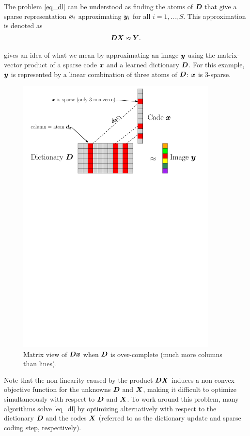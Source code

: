 \noindent
The problem \eqref{eq_dl} can be understood as finding the atoms of $\bm{D}$ that give a sparse representation $\bm{x}_i$ approximating $\bm{y}_i$ for all $i = 1,\dots,S$. This approximation is denoted as
\begin{equation*}\bm{D}\bm{X} \approx \bm{Y}.\end{equation*}

\noindent
{} gives an idea of what we mean by approximating an image $\bm{y}$ using the matrix-vector product of a sparse code $\bm{x}$ and a learned dictionary $\bm{D}$. For this example, $\bm{y}$ is represented by a linear combination of three atoms of $\bm{D}$: $\bm{x}$ is 3-sparse.

\begin{figure}[!ht] \centering
\includegraphics[width=0.90\textwidth]{figures/sparsity-matrix.pdf}
\caption{Matrix view of $\bm{D}\bm{x}$ when $\bm{D}$ is over-complete (much more columns than lines).}\label{fig_overcomplete_matrix}
\end{figure}


Note that the non-linearity caused by the product $\bm{D}\bm{X}$ induces a non-convex objective function for the unknowns $\bm{D}$ and $\bm{X}$, making it difficult to optimize simultaneously with respect to $\bm{D}$ and $\bm{X}$. To work around this problem, many algorithms solve \eqref{eq_dl} by optimizing alternatively with respect to the dictionary $\bm{D}$ and the codes $\bm{X}$ (referred to as the dictionary update and sparse coding step, respectively).

